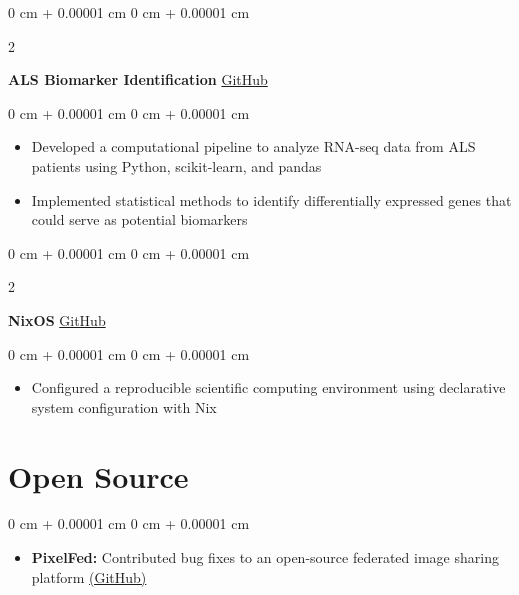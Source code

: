\documentclass[10pt, letterpaper]{article}
\newenvironment{highlights}{
    \begin{itemize}[
        topsep=0.10 cm,
        parsep=0.10 cm,
        partopsep=0pt,
        itemsep=0pt,
        leftmargin=0 cm + 10pt
    ]
}{
    \end{itemize}
} %
\newenvironment{onecolentry}{
    \begin{adjustwidth}{
        0 cm + 0.00001 cm
    }{
        0 cm + 0.00001 cm
    }
}{
    \end{adjustwidth}
} %
\newenvironment{twocolentry}[2][]{
    \onecolentry
    \def\secondColumn{#2}
    \setcolumnwidth{\fill, 4.5 cm}
    \begin{paracol}{2}
}{
    \switchcolumn \raggedleft \secondColumn
    \end{paracol}
    \endonecolentry
} %
\begin{document}
        \begin{twocolentry}{
            \href{https://github.com/demic-dev/als-biomarker-identification-project}{GitHub}
        }
        \textbf{ALS Biomarker Identification}\end{twocolentry}

        \vspace{0.10 cm}
        \begin{onecolentry}
            \begin{highlights}
                \item Developed a computational pipeline to analyze RNA-seq data from ALS patients using Python, scikit-learn, and pandas
                \item Implemented statistical methods to identify differentially expressed genes that could serve as potential biomarkers
            \end{highlights}
        \end{onecolentry}

        \vspace{0.2 cm}

        \begin{twocolentry}{
            \href{https://github.com/demic-dev/nixos-config}{GitHub}
        }
          \textbf{NixOS}\end{twocolentry}

        \vspace{0.10 cm}
        \begin{onecolentry}
            \begin{highlights}
                \item Configured a reproducible scientific computing environment using declarative system configuration with Nix
            \end{highlights}
        \end{onecolentry}

        \vspace{0.2 cm}

    \section{Open Source}
        \begin{onecolentry}
            \begin{highlights}
                \item \textbf{PixelFed:} Contributed bug fixes to an open-source federated image sharing platform \href{https://github.com/pixelfed/pixelfed-rn/pulls?q=author%3Ademic-dev}{(GitHub)}
            \end{highlights}
        \end{onecolentry}
\end{document}
